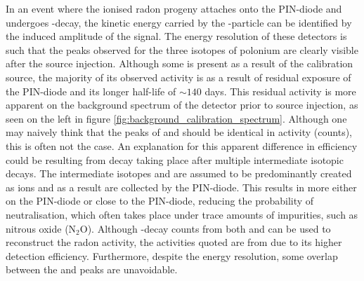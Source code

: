 In an event where the ionised radon progeny attaches onto the PIN-diode and undergoes \alpha{}-decay, the kinetic energy carried by the \alpha{}-particle can be identified by the induced amplitude of the signal. The energy resolution of these detectors is such that the peaks observed for the three isotopes of polonium are clearly visible after the source injection. Although some \PoTOZ{} is present as a result of the calibration source, the majority of its observed activity is as a result of residual exposure of the PIN-diode and its longer half-life of $\sim140$ days. This residual activity is more apparent on the background spectrum of the detector prior to source injection, as seen on the left in figure \ref{fig:background_calibration_spectrum}. Although one may naively think that the peaks of \PoTOE{} and \PoTOF{} should be identical in activity (counts), this is often not the case. An explanation for this apparent difference in efficiency could be resulting from \PoTOF{} decay taking place after multiple intermediate isotopic decays. The intermediate isotopes \PbTOF{} and \BiTOE{} are assumed to be predominantly created as ions and as a result are collected by the PIN-diode. This results in more \PbTOF{} either on the PIN-diode or close to the PIN-diode, reducing the probability of neutralisation, which often takes place under trace amounts of impurities, such as nitrous oxide (N$_{2}$O). Although \alpha{}-decay counts from both \PoTOE{} and \PoTOF{} can be used to reconstruct the radon activity, the activities quoted are from \PoTOF{} due to its higher detection efficiency. Furthermore, despite the energy resolution, some overlap between the \PoTOE{} and \PoTOZ{} peaks are unavoidable.
%
